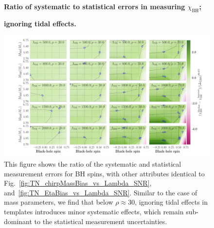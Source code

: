 \documentclass[aps,prd,amsmath,floats,floatfix, twocolumn,
superscriptaddress,nofootinbib,showpacs]{revtex4-1}
\newcommand{\chibh}{\chi_\mathrm{BH}}
\begin{document}
\begin{figure}
\centering
\textbf{Ratio of systematic to statistical errors in measuring $\chibh$;}\par
\textbf{ignoring tidal effects.}\par\medskip
\includegraphics[width=1.95\columnwidth]{plots/TNChiBHBiasesOverCIWidths_CI90_0_Lambda_SNR_linear}
\caption{This figure shows the ratio of the systematic and statistical
measurement errors for BH spins, with other attributes identical to 
Fig.~\ref{fig:TN_chirpMassBias_vs_Lambda_SNR}, and~\ref{fig:TN_EtaBias_vs_Lambda_SNR}.
Similar to the case of mass parameters, we find that below $\rho\approx 30$,
ignoring tidal effects in templates introduces minor systematic effects,
which remain sub-dominant to the statistical measurement uncertainties.
}
\label{fig:TN_BHspinBias_vs_Lambda_SNR}
\end{figure}
%
% 
\end{document}
